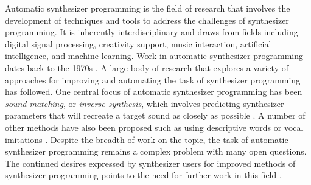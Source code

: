 Automatic synthesizer programming is the field of research that involves the development of techniques and tools to address the challenges of synthesizer programming. It is inherently interdisciplinary and draws from fields including digital signal processing, creativity support, music interaction, artificial intelligence, and machine learning. Work in automatic synthesizer programming dates back to the 1970s \cite{justice1979analytic}. A large body of research that explores a variety of approaches for improving and automating the task of synthesizer programming has followed. One central focus of automatic synthesizer programming has been \textit{sound matching}, or \textit{inverse synthesis}, which involves predicting synthesizer parameters that will recreate a target sound as closely as possible \cite{horner1993machine}. A number of other methods have also been proposed such as using descriptive words \cite{seago2013new} or vocal imitations \cite{cartwright2014synthassist}. Despite the breadth of work on the topic, the task of automatic synthesizer programming remains a complex problem with many open questions. The continued desires expressed by synthesizer users for improved methods of synthesizer programming points to the need for further work in this field \cite{krekovic2019insights}.


